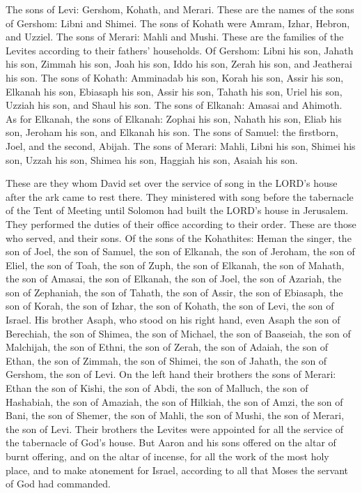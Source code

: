  The sons of Levi: Gershom, Kohath, and Merari.
 These are the names of the sons of Gershom: Libni and
Shimei.  The sons of Kohath were Amram, Izhar, Hebron, and
Uzziel.  The sons of Merari: Mahli and Mushi. These are the
families of the Levites according to their fathers' households.
 Of Gershom: Libni his son, Jahath his son, Zimmah his son,
 Joah his son, Iddo his son, Zerah his son, and Jeatherai
his son.  The sons of Kohath: Amminadab his son, Korah his
son, Assir his son,  Elkanah his son, Ebiasaph his son,
Assir his son,  Tahath his son, Uriel his son, Uzziah his
son, and Shaul his son.  The sons of Elkanah: Amasai and
Ahimoth.  As for Elkanah, the sons of Elkanah: Zophai his
son, Nahath his son,  Eliab his son, Jeroham his son, and
Elkanah his son.  The sons of Samuel: the firstborn, Joel,
and the second, Abijah.  The sons of Merari: Mahli, Libni
his son, Shimei his son, Uzzah his son,  Shimea his son,
Haggiah his son, Asaiah his son.

 These are they whom David set over the service of song in
the LORD's house after the ark came to rest there.  They
ministered with song before the tabernacle of the Tent of Meeting until
Solomon had built the LORD's house in Jerusalem. They performed the
duties of their office according to their order.  These are
those who served, and their sons. Of the sons of the Kohathites: Heman
the singer, the son of Joel, the son of Samuel,  the son of
Elkanah, the son of Jeroham, the son of Eliel, the son of Toah,
 the son of Zuph, the son of Elkanah, the son of Mahath,
the son of Amasai,  the son of Elkanah, the son of Joel,
the son of Azariah, the son of Zephaniah,  the son of
Tahath, the son of Assir, the son of Ebiasaph, the son of Korah,
 the son of Izhar, the son of Kohath, the son of Levi, the
son of Israel.  His brother Asaph, who stood on his right
hand, even Asaph the son of Berechiah, the son of Shimea, 
the son of Michael, the son of Baaseiah, the son of Malchijah,
 the son of Ethni, the son of Zerah, the son of Adaiah,
 the son of Ethan, the son of Zimmah, the son of Shimei,
 the son of Jahath, the son of Gershom, the son of Levi.
 On the left hand their brothers the sons of Merari: Ethan
the son of Kishi, the son of Abdi, the son of Malluch,  the
son of Hashabiah, the son of Amaziah, the son of Hilkiah, 
the son of Amzi, the son of Bani, the son of Shemer,  the
son of Mahli, the son of Mushi, the son of Merari, the son of Levi.
 Their brothers the Levites were appointed for all the
service of the tabernacle of God's house.  But Aaron and
his sons offered on the altar of burnt offering, and on the altar of
incense, for all the work of the most holy place, and to make atonement
for Israel, according to all that Moses the servant of God had
commanded.

